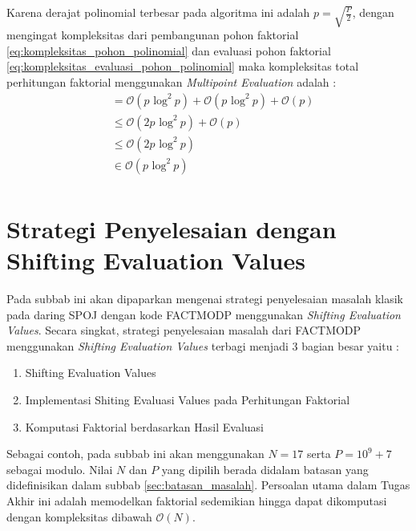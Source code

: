 Karena derajat polinomial terbesar pada algoritma ini adalah $ p = \sqrt{\frac{P}{2}} $, dengan mengingat kompleksitas dari pembangunan pohon faktorial \eqref{eq:kompleksitas_pohon_polinomial} dan evaluasi pohon faktorial \eqref{eq:kompleksitas_evaluasi_pohon_polinomial} maka kompleksitas total perhitungan faktorial menggunakan \textit{Multipoint Evaluation} adalah :
\begin{equation}
	\begin{aligned}
		&= \mathcal{O}{(p \text{ log}^2\ p)} + \mathcal{O}{(p \text{ log}^2\ p)} + \mathcal{O}{(p)} \\
		&\leq \mathcal{O}{(2p \text{ log}^2\ p)} + \mathcal{O}{(p)} \\
		&\leq \mathcal{O}{(2p \text{ log}^2\ p)} \\
		&\in \mathcal{O}{(p \text{ log}^2\ p)} \\
	\end{aligned}
	\label{eq:kompleksitas_multipoint_eval_faktorial}
\end{equation}

\newpage

\section{ Strategi Penyelesaian dengan Shifting Evaluation Values}
Pada subbab ini akan dipaparkan mengenai strategi penyelesaian masalah klasik pada daring SPOJ dengan kode FACTMODP menggunakan \textit{Shifting Evaluation Values}. Secara singkat, strategi penyelesaian masalah dari FACTMODP menggunakan \textit{Shifting Evaluation Values} terbagi menjadi 3 bagian besar yaitu :
\begin{enumerate}
	\item Shifting Evaluation Values
	\item Implementasi Shiting Evaluasi Values pada Perhitungan Faktorial
	\item Komputasi Faktorial berdasarkan Hasil Evaluasi
\end{enumerate}

Sebagai contoh, pada subbab ini akan menggunakan $ N = 17 $ serta $ P = 10^9 + 7 $ sebagai modulo. Nilai $ N $ dan $ P $ yang dipilih berada didalam batasan yang didefinisikan dalam subbab \ref{sec:batasan_masalah}. Persoalan utama dalam Tugas Akhir ini adalah memodelkan faktorial sedemikian hingga dapat dikomputasi dengan kompleksitas dibawah $ \mathcal{O}{(N)} $.

